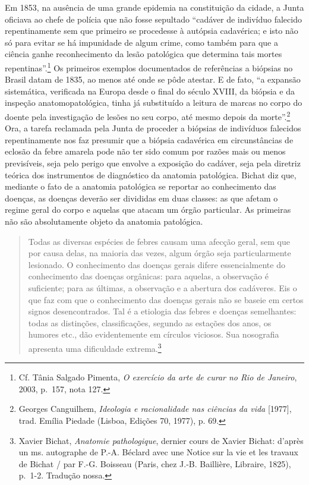 Em 1853, na ausência de uma grande epidemia na constituição da cidade, a
Junta oficiava ao chefe de polícia que não fosse sepultado ``cadáver de
indivíduo falecido repentinamente sem que primeiro se procedesse à
autópsia cadavérica; e isto não só para evitar se há impunidade de algum
crime, como também para que a ciência ganhe reconhecimento da lesão
patológica que determina tais mortes repentinas''.\footnote{Cf. Tânia
  Salgado Pimenta, \emph{O exercício da arte de curar no Rio de
  Janeiro}, 2003, p.~157, nota 127.} Os primeiros exemplos documentados
de referências a biópsias no Brasil datam de 1835, ao menos até onde se
pôde atestar. E de fato, ``a expansão sistemática, verificada na Europa
desde o final do século XVIII, da biópsia e da inspeção
anatomopatológica, tinha já substituído a leitura de marcas no corpo do
doente pela investigação de lesões no seu corpo, até mesmo depois da
morte''.\footnote{Georges Canguilhem, \emph{Ideologia e racionalidade
  nas ciências da vida} {[}1977{]}, trad. Emília Piedade (Lisboa,
  Edições 70, 1977), p. 69.} Ora, a tarefa reclamada pela Junta de
proceder a biópsias de indivíduos falecidos repentinamente nos faz
presumir que a biópsia cadavérica em circunstâncias de eclosão da febre
amarela pode não ter sido comum por razões mais ou menos previsíveis,
seja pelo perigo que envolve a exposição do cadáver, seja pela diretriz
teórica dos instrumentos de diagnóstico da anatomia patológica. Bichat
diz que, mediante o fato de a anatomia patológica se reportar ao
conhecimento das doenças, as doenças deverão ser divididas em duas
classes: as que afetam o regime geral do corpo e aquelas que atacam um
órgão particular. As primeiras não são absolutamente objeto da anatomia
patológica.

\begin{quote}
Todas as diversas espécies de febres causam uma afecção geral, sem que
por causa delas, na maioria das vezes, algum órgão seja particularmente
lesionado. O conhecimento das doenças gerais difere essencialmente do
conhecimento das doenças orgânicas: para aquelas, a observação é
suficiente; para as últimas, a observação e a abertura dos cadáveres.
Eis o que faz com que o conhecimento das doenças gerais não se baseie em
certos signos desencontrados. Tal é a etiologia das febres e doenças
semelhantes: todas as distinções, classificações, segundo as estações
dos anos, os humores etc., dão evidentemente em círculos viciosos. Sua
nosografia apresenta uma dificuldade extrema.\footnote{Xavier Bichat,
  \emph{Anatomie pathologique}, dernier cours de Xavier Bichat: d'après
  un ms. autographe de P.-A. Béclard avec une Notice sur la vie et les
  travaux de Bichat / par F.-G. Boisseau (Paris, chez J.-B. Baillière,
  Libraire, 1825), p.~1-2. Tradução nossa.}
\end{quote}

